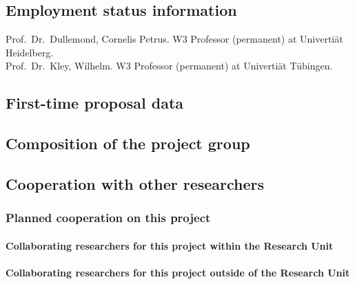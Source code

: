 \documentclass[10pt,fleqn,twoside]{article}
\begin{document}
\subsection{Employment status information}
Prof.~Dr.~Dullemond, Cornelis Petrus.
W3 Professor (permanent) at Univerti\"at Heidelberg.\\
Prof.~Dr.~Kley, Wilhelm.
W3 Professor (permanent) at Univerti\"at T\"ubingen.


\subsection{First-time proposal data}

\subsection{Composition of the project group}

\todo{[Text]}

\subsection{Cooperation with other researchers}

\subsubsection{Planned cooperation on this project}

\paragraph{Collaborating researchers for this project within the
  Research Unit}

\todo{[Text]}

\paragraph{Collaborating researchers for this project outside of
  the Research Unit}
\end{document}
